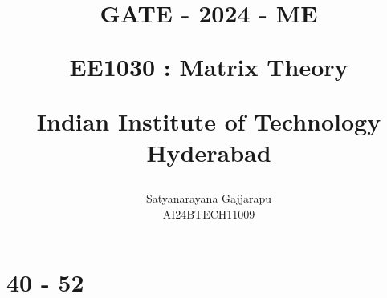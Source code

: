 \documentclass[journal]{IEEEtran}
\begin{document}

\vspace{3cm}




\title{
GATE - 2024 - ME

\large{EE1030 : Matrix Theory}

Indian Institute of Technology Hyderabad
}
\author{Satyanarayana Gajjarapu

AI24BTECH11009
}	





\maketitle




\bigskip

\renewcommand{\thefigure}{\theenumi}
\renewcommand{\thetable}{\theenumi}


\section{40 - 52}
\end{document}
